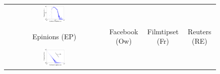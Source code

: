 \documentclass[11pt,a4paper]{book}
\newcommand{\wFourMinusTabular}{0.227}
\begin{document}
\begin{figure}[h!]
\begin{tabular}{c c c c}
    \includegraphics[width=\wFourMinusTabular\textwidth]{img-ns-svg/degree.u.reuters.limit} \\
    Epinions (\textsf{EP}) &
    Facebook (\textsf{Ow}) &
    Filmtipset (\textsf{Fr}) &
    Reuters (\textsf{RE}) \\
    \includegraphics[width=\wFourMinusTabular\textwidth]{img-st/degree.ux.bibsonomy-2ti} &  

\end{tabular}
\end{figure}
\end{document}
